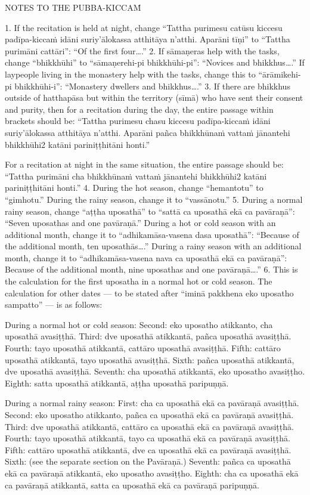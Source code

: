NOTES TO THE PUBBA-KICCAṀ

1. If the recitation is held at night, change “Tattha purimesu catūsu kiccesu padīpa-kiccaṁ idāni suriy’ālokassa atthitāya n’atthi. Aparāni tīṇi” to “Tattha purimāni cattāri”: “Of the first four….”
2. If sāmaṇeras help with the tasks, change “bhikkhūhi” to “sāmaṇerehi-pi bhikkhūhi-pi”: “Novices and bhikkhus….” If laypeople living in the monastery help with the tasks, change this to “ārāmikehi-pi bhikkhūhi-i”: “Monastery dwellers and bhikkhus….”
3. If there are bhikkhus outside of hatthapāsa but within the territory (sīmā) who have sent their consent and purity, then for a recitation during the day, the
entire passage within brackets should be: “Tattha purimesu chasu kiccesu padīpa-kiccaṁ idāni suriy’ālokassa atthitāya n’atthi. Aparāni pañca
bhikkhūnaṁ vattaṁ jānantehi bhikkhūhi2 katāni pariniṭṭhitāni honti.”

For a recitation at night in the same situation, the entire passage should be:
“Tattha purimāni cha bhikkhūnaṁ vattaṁ jānantehi bhikkhūhi2 katāni
pariniṭṭhitāni honti.”
4. During the hot season, change “hemantotu” to “gimhotu.” During the rainy season, change it to “vassānotu.”
5. During a normal rainy season, change “aṭṭha uposathā” to “sattā ca uposathā ekā ca pavāraṇā”: “Seven uposathas and one pavāraṇā.”
During a hot or cold season with an additional month, change it to “adhikamāsa-vasena dasa uposathā”: “Because of the additional month, ten
uposathās….”
During a rainy season with an additional month, change it to “adhikamāsa-vasena nava ca uposathā ekā ca pavāraṇā”: Because of the
additional month, nine uposathas and one pavāraṇā….”
6. This is the calculation for the first uposatha in a normal hot or cold season. The calculation for other dates — to be stated after “iminā pakkhena
eko uposatho sampatto” — is as follows:

During a normal hot or cold season:
Second: eko uposatho atikkanto, cha uposathā avasiṭṭhā.
Third: dve uposathā atikkantā, pañca uposathā avasiṭṭhā.
Fourth: tayo uposathā atikkantā, cattāro uposathā avasiṭṭhā.
Fifth: cattāro uposathā atikkantā, tayo uposathā avasiṭṭhā.
Sixth: pañca uposathā atikkantā, dve uposathā avasiṭṭhā.
Seventh: cha uposathā atikkantā, eko uposatho avasiṭṭho.
Eighth: satta uposathā atikkantā, aṭṭha uposathā paripuṇṇā.

During a normal rainy season:
First: cha ca uposathā ekā ca pavāraṇā avasiṭṭhā.
Second: eko uposatho atikkanto, pañca ca uposathā ekā ca pavāraṇā avasiṭṭhā.
Third: dve uposathā atikkantā, cattāro ca uposathā ekā ca pavāraṇā avasiṭṭhā.
Fourth: tayo uposathā atikkantā, tayo ca uposathā ekā ca pavāraṇā avasiṭṭhā.
Fifth: cattāro uposathā atikkantā, dve ca uposathā ekā ca pavāraṇā avasiṭṭhā.
Sixth: (see the separate section on the Pavāraṇā.)
Seventh: pañca ca uposathā ekā ca pavāraṇā atikkantā, eko uposatho avasiṭṭho.
Eighth: cha ca uposathā ekā ca pavāraṇā atikkantā, satta ca uposathā ekā ca pavāraṇā paripuṇṇā.

